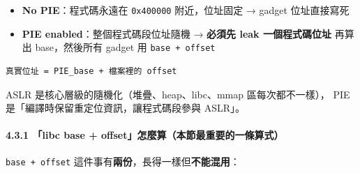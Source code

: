 \documentclass[10pt,a4paper]{article}
\providecommand{\tightlist}{%
  \setlength{\itemsep}{0pt}\setlength{\parskip}{0pt}}
\renewenvironment{quote}{%
  \begin{mdframed}[linewidth=0pt,innerleftmargin=0pt,innerrightmargin=0pt,
    innerbottommargin=0pt,innertopmargin=0pt,skipabove=0.55em,skipbelow=0.55em,
    leftmargin=0.9em,rightmargin=0.4em,startcode={\color{quotebar}\vrule width 2.6pt},%
    endcode={}]%
  \itshape\color{black}%
}{%
  \end{mdframed}%
}
\begin{document}
\begin{itemize}
\tightlist
\item
  \textbf{No PIE}：程式碼永遠在 \texttt{0x400000} 附近，位址固定 →
  gadget 位址直接寫死
\item
  \textbf{PIE enabled}：整個程式碼段位址隨機 → \textbf{必須先 leak
  一個程式碼位址} 再算出 base，然後所有 gadget 用
  \texttt{base\ \allowbreak{}+\ \allowbreak{}offset}
\end{itemize}

\begin{Verbatim}[breaklines=true,breakanywhere=true,breakautoindent=false,fontsize=\fontsize{7.0}{9.5}\selectfont]
真實位址 = PIE_base + 檔案裡的 offset
\end{Verbatim}

\begin{quote}
ASLR 是核心層級的隨機化（堆疊、heap、libc、mmap 區每次都不一樣）， PIE
是「編譯時保留重定位資訊，讓程式碼段參與 ASLR」。
\end{quote}

\paragraph{4.3.1 「libc base +
offset」怎麼算（本節最重要的一條算式）}\label{libc-base-offsetux600eux9ebcux7b97ux672cux7bc0ux6700ux91cdux8981ux7684ux4e00ux689dux7b97ux5f0f}

\texttt{base\ \allowbreak{}+\ \allowbreak{}offset}
這件事有\textbf{兩份}，長得一樣但\textbf{不能混用}：
\end{document}
